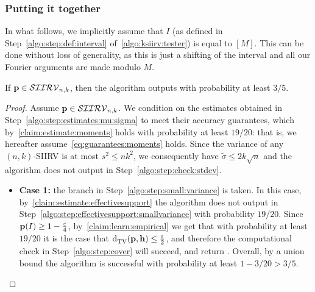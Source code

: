 \subsubsection{Putting it together}

In what follows, we implicitly assume that $I$ (as defined in Step~\ref{algo:step:def:interval} of~\cref{algo:ksiirv:tester}) is equal to $[M]$. This can be done without loss of generality, as this is just a shifting of the interval and all our Fourier arguments are made modulo $M$.

\begin{lemma}\label{lemma:completeness}
  If $\p \in \classksiirv[n]{k}$, then the algorithm outputs \accept with probability at least $3/5$.
\end{lemma}
\begin{proof}
Assume $\p \in \classksiirv[n]{k}$. We condition on the estimates obtained in Step~\ref{algo:step:estimates:mu:sigma} to meet their accuracy guarantees, which by~\cref{claim:estimate:moments} holds with probability at least $19/20$: that is, we hereafter assume~\cref{eq:guarantees:moments} holds. Since the variance of any $(n,k)$-SIIRV is at most $s^2 \leq n k^2$, we consequently have $\widetilde{\sigma} \leq 2k\sqrt{n}$ and the algorithm does not output \reject in Step~\ref{algo:step:check:stdev}.

\begin{itemize}
\item \textbf{Case 1:} the branch in Step~\ref{algo:step:small:variance} is taken.
In this case, by~\cref{claim:estimate:effectivesupport} the algorithm does not output \reject in Step~\ref{algo:step:effectivesupport:smallvariance} with probability $19/20$. Since $\p(I)\geq 1-\frac{\eps}{4}$, by~\cref{claim:learn:empirical} we get that with probability at least $19/20$ it is the case that $\totalvardist{\p}{\h}\leq \frac{\eps}{2}$, and therefore the computational check in Step~\ref{algo:step:cover} will succeed, and return \accept. Overall, by a union bound the algorithm is successful with probability at least $1-3/20>3/5$.


\end{itemize}
\end{proof}
